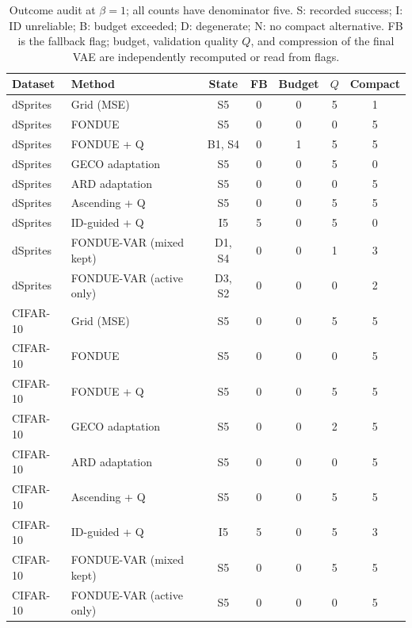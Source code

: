 \begin{table}[H]
\caption{Outcome audit at $\beta=1$; all counts have denominator five. S: recorded success; I: ID unreliable; B: budget exceeded; D: degenerate; N: no compact alternative. FB is the fallback flag; budget, validation quality $Q$, and compression of the final VAE are independently recomputed or read from flags.}\label{tab:outcomes1}
\footnotesize
\setlength{\tabcolsep}{3.5pt}
\begin{tabular*}{\textwidth}{@{\extracolsep{\fill}}llccccc@{}}
\toprule
Dataset & Method & State & FB & Budget & $Q$ & Compact \\
\midrule
dSprites & Grid (MSE) & S5 & 0 & 0 & 5 & 1 \\
dSprites & FONDUE & S5 & 0 & 0 & 0 & 5 \\
dSprites & FONDUE + Q & B1, S4 & 0 & 1 & 5 & 5 \\
dSprites & GECO adaptation & S5 & 0 & 0 & 5 & 0 \\
dSprites & ARD adaptation & S5 & 0 & 0 & 0 & 5 \\
dSprites & Ascending + Q & S5 & 0 & 0 & 5 & 5 \\
dSprites & ID-guided + Q & I5 & 5 & 0 & 5 & 0 \\
dSprites & FONDUE-VAR (mixed kept) & D1, S4 & 0 & 0 & 1 & 3 \\
dSprites & FONDUE-VAR (active only) & D3, S2 & 0 & 0 & 0 & 2 \\
CIFAR-10 & Grid (MSE) & S5 & 0 & 0 & 5 & 5 \\
CIFAR-10 & FONDUE & S5 & 0 & 0 & 0 & 5 \\
CIFAR-10 & FONDUE + Q & S5 & 0 & 0 & 5 & 5 \\
CIFAR-10 & GECO adaptation & S5 & 0 & 0 & 2 & 5 \\
CIFAR-10 & ARD adaptation & S5 & 0 & 0 & 0 & 5 \\
CIFAR-10 & Ascending + Q & S5 & 0 & 0 & 5 & 5 \\
CIFAR-10 & ID-guided + Q & I5 & 5 & 0 & 5 & 3 \\
CIFAR-10 & FONDUE-VAR (mixed kept) & S5 & 0 & 0 & 5 & 5 \\
CIFAR-10 & FONDUE-VAR (active only) & S5 & 0 & 0 & 0 & 5 \\
\bottomrule
\end{tabular*}
\end{table}
